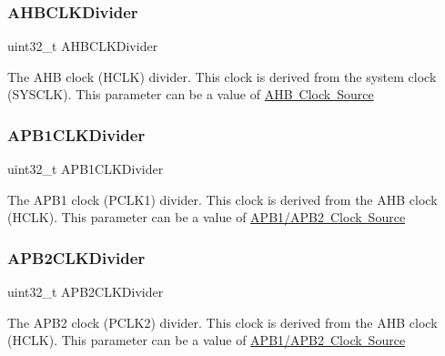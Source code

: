 \subsubsection{\texorpdfstring{A\+H\+B\+C\+L\+K\+Divider}{AHBCLKDivider}}
{\footnotesize\ttfamily uint32\+\_\+t A\+H\+B\+C\+L\+K\+Divider}

The A\+HB clock (H\+C\+LK) divider. This clock is derived from the system clock (S\+Y\+S\+C\+LK). This parameter can be a value of \mbox{\hyperlink{group___r_c_c___a_h_b___clock___source}{A\+HB Clock Source}} \mbox{\label{struct_r_c_c___clk_init_type_def_a994aca51c40decfc340e045da1a6ca19}} 
\subsubsection{\texorpdfstring{A\+P\+B1\+C\+L\+K\+Divider}{APB1CLKDivider}}
{\footnotesize\ttfamily uint32\+\_\+t A\+P\+B1\+C\+L\+K\+Divider}

The A\+P\+B1 clock (P\+C\+L\+K1) divider. This clock is derived from the A\+HB clock (H\+C\+LK). This parameter can be a value of \mbox{\hyperlink{group___r_c_c___a_p_b1___a_p_b2___clock___source}{A\+P\+B1/\+A\+P\+B2 Clock Source}} \mbox{\label{struct_r_c_c___clk_init_type_def_a9bbc30e9f4ddf462bc1fa6ea273eb4db}} 
\subsubsection{\texorpdfstring{A\+P\+B2\+C\+L\+K\+Divider}{APB2CLKDivider}}
{\footnotesize\ttfamily uint32\+\_\+t A\+P\+B2\+C\+L\+K\+Divider}

The A\+P\+B2 clock (P\+C\+L\+K2) divider. This clock is derived from the A\+HB clock (H\+C\+LK). This parameter can be a value of \mbox{\hyperlink{group___r_c_c___a_p_b1___a_p_b2___clock___source}{A\+P\+B1/\+A\+P\+B2 Clock Source}} \mbox{\label{struct_r_c_c___clk_init_type_def_afe92b105bff8e698233c286bb3018384}} 
